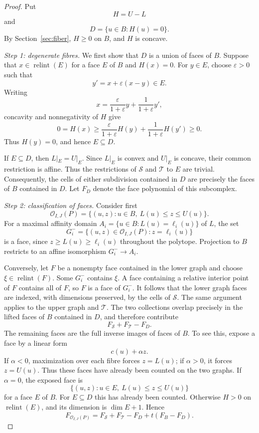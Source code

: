 \documentclass[a4paper,12pt]{amsart}
\theoremstyle{definition}
\theoremstyle{remark}
\newcommand{\OO}{\mathcal O}
\newcommand{\relint}{\operatorname{relint}}
\begin{document}
\begin{proof}
Put
\[
 H=U-L
\]
and
\[
 D=\{u\in B:H(u)=0\}.
\]
By Section~\ref{sec:fiber}, $H\geq0$ on $B$, and $H$ is concave.

\smallskip
\noindent\emph{Step 1: degenerate fibres.}
We first show that $D$ is a union of faces of $B$. 
Suppose that $x\in\relint(E)$ for a face $E$ of $B$ and $H(x)=0$. 
For $y\in E$, choose $\varepsilon>0$ such that
\[
 y'=x+\varepsilon(x-y)\in E.
\]
Writing
\[
 x=\frac{\varepsilon}{1+\varepsilon}y+\frac{1}{1+\varepsilon}y',
\]
concavity and nonnegativity of $H$ give
\[
 0=H(x)\geq \frac{\varepsilon}{1+\varepsilon}H(y)+\frac{1}{1+\varepsilon}H(y')\geq0.
\]
Thus $H(y)=0$, and hence $E\subseteq D$.

If $E\subseteq D$, then $L|_E=U|_E$. Since $L|_E$ is convex and $U|_E$ is concave, their common restriction is affine. 
Thus the restrictions of $\mathcal S$ and $\mathcal T$ to $E$ are trivial. 
Consequently, the cells of either subdivision contained in $D$ are precisely the faces of $B$ contained in $D$. 
Let $F_D$ denote the face polynomial of this subcomplex.

\smallskip
\noindent\emph{Step 2: classification of faces.}
Consider first
\[
 \OO_{I,J}(P)=\{(u,z):u\in B,\ L(u)\leq z\leq U(u)\}.
\]
For a maximal affinity domain
$A_i=\{u\in B:L(u)=\ell_i(u)\}$ of $L$, the set
\[
 G_i^-=\{(u,z)\in\OO_{I,J}(P):z=\ell_i(u)\}
\]
is a face, since $z\geq L(u)\geq\ell_i(u)$ throughout the polytope.
Projection to $B$ restricts to an affine isomorphism $G_i^-\to A_i$.

Conversely, let $F$ be a nonempty face contained in the lower graph and choose $\xi\in\relint(F)$. 
Some $G_i^-$ contains $\xi$.
A face containing a relative interior point of $F$ contains all of $F$, so $F$ is a face of $G_i^-$. 
It follows that the lower graph faces are indexed, with dimensions preserved, by the cells of $\mathcal S$. 
The same argument applies to the upper graph and $\mathcal T$. 
The two collections overlap precisely in the lifted faces of $B$ contained in $D$, and therefore contribute
\[
 F_{\mathcal S}+F_{\mathcal T}-F_D.
\]
The remaining faces are the full inverse images of faces of $B$. 
To see this, expose a face by a linear form
\[
 c(u)+\alpha z.
\]
If $\alpha<0$, maximization over each fibre forces $z=L(u)$; if $\alpha>0$, it forces $z=U(u)$. 
Thus these faces have already been counted on the two graphs. If $\alpha=0$, the exposed face is
\[
 \{(u,z):u\in E,\ L(u)\leq z\leq U(u)\}
\]
for a face $E$ of $B$. 
For $E\subseteq D$ this has already been counted. 
Otherwise $H>0$ on $\relint(E)$, and its dimension is $\dim E+1$. 
Hence
\begin{equation}\label{eq:old-face-count}
 F_{\OO_{I,J}(P)}  =F_{\mathcal S}+F_{\mathcal T}-F_D+t(F_B-F_D).
\end{equation}


\end{proof}
\end{document}
